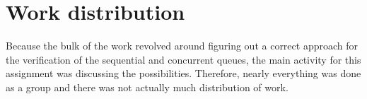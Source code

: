 \section{Work distribution}
Because the bulk of the work revolved around figuring out a correct approach for the verification of the sequential and concurrent queues, the main activity for this assignment was discussing the possibilities. Therefore, nearly everything was done as a group and there was not actually much distribution of work.